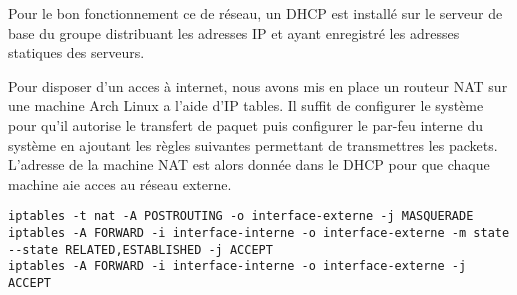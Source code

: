 Pour le bon fonctionnement ce de réseau, un DHCP est installé sur le serveur de base du groupe distribuant les adresses IP et ayant enregistré les adresses statiques des serveurs.

Pour disposer d'un acces à internet, nous avons mis en place un routeur NAT sur une machine Arch Linux a l'aide d'IP tables.
Il suffit de configurer le système pour qu'il autorise le transfert de paquet puis configurer le par-feu interne du système en ajoutant les règles suivantes permettant de transmettres les packets.
L'adresse de la machine NAT est alors donnée dans le DHCP pour que chaque machine aie acces au réseau externe.

\begin{lstlisting}[caption=Commandes iptables permettant l'installation d'un NAT]
iptables -t nat -A POSTROUTING -o interface-externe -j MASQUERADE
iptables -A FORWARD -i interface-interne -o interface-externe -m state --state RELATED,ESTABLISHED -j ACCEPT
iptables -A FORWARD -i interface-interne -o interface-externe -j ACCEPT
\end{lstlisting}

